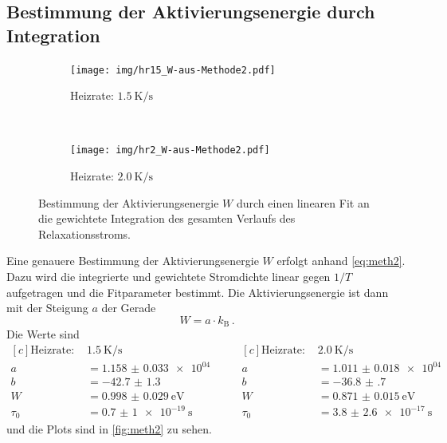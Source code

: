 \subsection{Bestimmung der Aktivierungsenergie durch Integration}
\label{sec:linin}

\begin{figure}[htp]
    \centering
    \begin{subfigure}[t]{0.5\textwidth}
        \centering
        \texttt{[image: img/hr15\_W-aus-Methode2.pdf]}
        \caption{Heizrate: $\SI{1.5}{\kelvin\per\second}$}
    \end{subfigure}%
    ~
    \begin{subfigure}[t]{0.5\textwidth}
        \centering
        \texttt{[image: img/hr2\_W-aus-Methode2.pdf]}
        \caption{Heizrate: $\SI{2.0}{\kelvin\per\second}$}
    \end{subfigure}
    \caption{Bestimmung der Aktivierungsenergie $W$ durch einen linearen Fit an die gewichtete Integration des gesamten Verlaufs des Relaxationsstroms.}
    \label{fig:meth2}
\end{figure}

Eine genauere Bestimmung der Aktivierungsenergie $W$ erfolgt anhand \autoref{eq:meth2}. Dazu wird die integrierte und gewichtete Stromdichte linear gegen $1/T$ aufgetragen und die Fitparameter bestimmt. Die Aktivierungsenergie ist dann mit der Steigung $a$ der Gerade
\begin{equation*}
    W = a \cdot k_\text{B}\,.
\end{equation*}
Die Werte sind
\begin{equation*}
\begin{aligned}[c]
  \text{Heizrate: }& \SI{1.5}{\kelvin\per\second}\\
  a &= \num{1.158(33)e+04}\\
  b &= \num{-42.7(13)}\\
  W &= \SI{0.998(29)}{\electronvolt}\\
  \tau_0 &= \SI{0.7(10)e-19}{\second}
\end{aligned}
\qquad
\begin{aligned}[c]
  \text{Heizrate: }& \SI{2.0}{\kelvin\per\second}\\
  a &= \num{1.011(18)e+04}\\
  b &= \num{-36.8(7)}\\
  W &= \SI{0.871(15)}{\electronvolt}\\
  \tau_0 &= \SI{3.8(26)e-17}{\second}
\end{aligned}
\end{equation*}
und die Plots sind in \autoref{fig:meth2} zu sehen.

